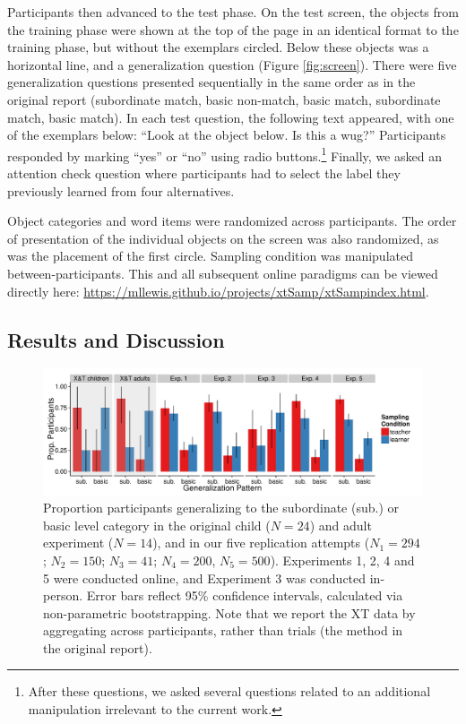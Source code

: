 \documentclass[man]{apa2}
\begin{document}
Participants then advanced to the test phase. On the test screen, the objects from the training phase were shown at the top of the page in an identical format to the training phase, but without the exemplars circled. Below these objects was a horizontal line, and a generalization question (Figure \ref{fig:screen}). There were five generalization questions presented sequentially in the same order as in the original report (subordinate match, basic non-match, basic match, subordinate match, basic match). In each test question, the following text appeared, with one of the exemplars below: ``Look at the object below. Is this a wug?'' Participants responded by marking ``yes'' or ``no'' using radio buttons.\footnote{After these questions, we asked several questions related to an additional manipulation irrelevant to the current work.} Finally, we asked an attention check question where participants had to select the label they previously learned from four alternatives.

Object categories and word items were randomized across participants. The order of presentation of the individual objects on the screen was also randomized, as was the placement of the first circle. Sampling condition was manipulated between-participants. This and all subsequent online paradigms can be viewed directly here: \url{https://mllewis.github.io/projects/xtSamp/xtSampindex.html}.

\subsection{Results and Discussion}

 \begin{figure} [t]
 \begin{center} 
 \includegraphics[width=6.2in]{figures/FIG_2.pdf} 
 \caption{\label{fig:bar_plots} Proportion participants generalizing to the subordinate (sub.) or basic level category in the original child ($N = 24$) and adult experiment ($N = 14$), and in our five replication attempts ($N_{1} = 294$; $N_{2} = 150$; $N_{3} = 41$; $N_{4} = 200$, $N_{5} = 500$). Experiments 1, 2, 4 and 5 were conducted online, and Experiment 3 was conducted in-person. Error bars reflect 95\% confidence intervals, calculated via non-parametric bootstrapping. Note that we report the XT data by aggregating across participants, rather than trials (the method in the original report).} 
 \end{center} 
\end{figure}
\end{document}

